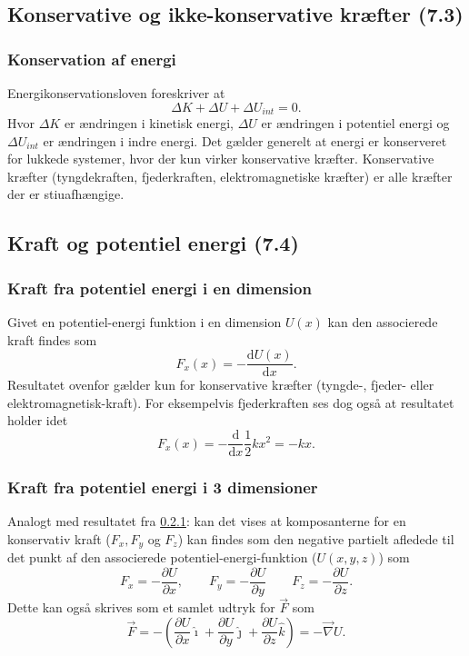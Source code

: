 \subsection{Konservative og ikke-konservative kræfter (7.3)}

\subsubsection{Konservation af energi} \label{afs:ekons}
Energikonservationsloven foreskriver at
\[ 
\Delta K + \Delta U + \Delta U_{int} = 0
.\]
Hvor $\Delta K$ er ændringen i kinetisk energi, $\Delta U$ er ændringen i potentiel energi og $\Delta U_{int}$ er ændringen i indre energi. Det gælder generelt at energi er konserveret for lukkede systemer, hvor der kun virker konservative kræfter. Konservative kræfter (tyngdekraften, fjederkraften, elektromagnetiske kræfter) er alle kræfter der er stiuafhængige. 


\subsection{Kraft og potentiel energi (7.4)}

\subsubsection{Kraft fra potentiel energi i en dimension} \label{sec:potfor1}
Givet en potentiel-energi funktion i en dimension $U(x)$ kan den associerede kraft findes som
\[ 
F_x(x) = -\frac{\mathrm{d}U(x)}{\mathrm{d}x} 
.\]
Resultatet ovenfor gælder kun for konservative kræfter (tyngde-, fjeder- eller elektromagnetisk-kraft). For eksempelvis fjederkraften ses dog også at resultatet holder idet
\[ 
F_x(x) = -\frac{\mathrm{d}}{\mathrm{d}x} \frac{1}{2}kx^2 = -kx
.\]

\subsubsection{Kraft fra potentiel energi i 3 dimensioner} \label{afs:potfor3}
Analogt med resultatet fra \ref{sec:potfor1}:  kan det vises at komposanterne for en konservativ kraft ($F_x, F_y$ og $F_z$) kan findes som den negative partielt afledede til det punkt af den associerede potentiel-energi-funktion ($U(x, y, z)$) som
\[ 
F_x = -\frac{\partial U}{\partial x}, \qquad F_y = - \frac{\partial U}{\partial y} \qquad F_z = - \frac{\partial U}{\partial z}
.\]
Dette kan også skrives som et samlet udtryk for $\Vec{F}$ som
\[ 
\Vec{F} = -\left( \frac{\partial U}{\partial x}\hat{\imath} + \frac{\partial U}{\partial y}\hat{\jmath} + \frac{\partial U}{\partial z}\hat{k} \right) = - \Vec{\nabla} U
.\]
